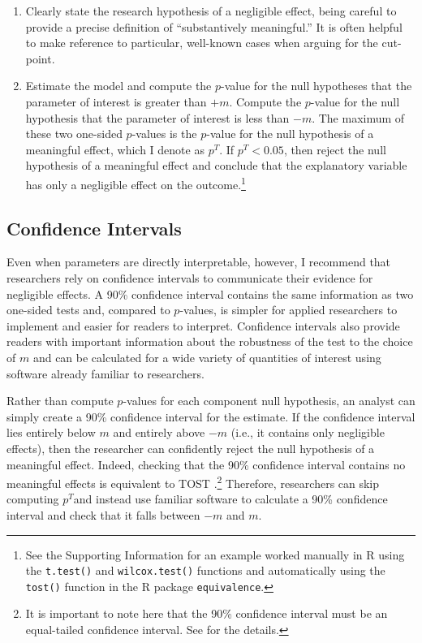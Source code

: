 \documentclass[12pt]{article}
\begin{document}
\begin{enumerate}
\item Clearly state the research hypothesis of a negligible effect, being careful to provide a precise definition of ``substantively meaningful.'' It is often helpful to make reference to particular, well-known cases when arguing for the cut-point.
\item Estimate the model and compute the $p$-value for the null hypotheses that the parameter of interest is greater than $+m$. Compute the $p$-value for the null hypothesis that the parameter of interest is less than $-m$. The maximum of these two one-sided $p$-values is the  $p$-value for the null hypothesis of a meaningful effect, which I denote as $p^T$. If $p^T < 0.05$,  then reject the null hypothesis of a meaningful effect and conclude that the explanatory variable has only a negligible effect on the outcome.\footnote{See the Supporting Information for an example  worked manually in R using the \texttt{t.test()} and \texttt{wilcox.test()} functions and automatically using the \texttt{tost()} function in the R package \texttt{equivalence}.}
\end{enumerate}

\subsection*{Confidence Intervals}

Even when parameters are directly interpretable, however, I recommend that researchers rely on confidence intervals to communicate their evidence for negligible effects. A 90\% confidence interval contains the same information as two one-sided tests and, compared to $p$-values, is simpler for applied researchers to implement and easier for readers to interpret. Confidence intervals also provide readers with important information about the robustness of the test to the choice of $m$ and can be calculated for a wide variety of quantities of interest using software already familiar to researchers. 

Rather than compute $p$-values for each component null hypothesis, an analyst can simply create a 90\% confidence interval for the estimate. If the confidence interval lies entirely below $m$ and entirely above $-m$ (i.e., it contains only negligible effects), then the researcher can confidently reject the null hypothesis of a meaningful effect. Indeed, checking that the 90\% confidence interval contains no meaningful effects is equivalent to TOST \citep{BergerHsu1996}.\footnote{It is important to note here that the 90\% confidence interval must be an equal-tailed confidence interval.  See \cite{BergerHsu1996} for the details.} Therefore, researchers can skip computing $p^T$and instead use familiar software to calculate a 90\% confidence interval and check that it falls between $-m$ and $m$. 
\end{document}

